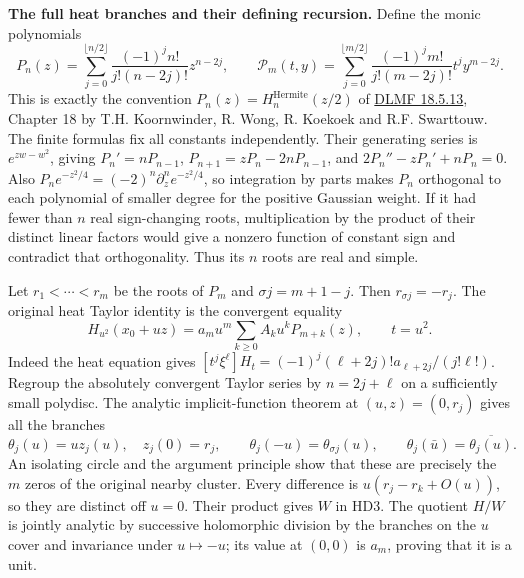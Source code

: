 \documentclass[11pt,a4paper]{article}
\theoremstyle{definition}\newtheorem{definition}[theorem]{Definition}
\begin{document}
\HD\textbf{The full heat branches and their defining recursion.}
Define the monic polynomials
\[
 P_n(z)=\sum_{j=0}^{\lfloor n/2\rfloor}
      \frac{(-1)^jn!}{j!(n-2j)!}z^{n-2j},\qquad
 \mathcal P_m(t,y)=
      \sum_{j=0}^{\lfloor m/2\rfloor}
       \frac{(-1)^jm!}{j!(m-2j)!}t^jy^{m-2j}.
 \tag{HD5}\label{hd:hermite}
\]
This is exactly the convention
$P_n(z)=H_n^{\mathrm{Hermite}}(z/2)$ of
\href{https://dlmf.nist.gov/18.5.E13}{DLMF 18.5.13},
Chapter 18 by T.H. Koornwinder, R. Wong, R. Koekoek and
R.F. Swarttouw. The finite formulas fix all constants independently.
Their generating series is $e^{zw-w^2}$, giving
$P_n'=nP_{n-1}$,
$P_{n+1}=zP_n-2nP_{n-1}$, and
$2P_n''-zP_n'+nP_n=0$.
Also $P_ne^{-z^2/4}=(-2)^n\partial_z^n e^{-z^2/4}$, so integration
by parts makes $P_n$ orthogonal to each polynomial of smaller
degree for the positive Gaussian weight. If it had fewer than
$n$ real sign-changing roots, multiplication by the product of
their distinct linear factors would give a nonzero function of
constant sign and contradict that orthogonality. Thus its $n$
roots are real and simple.

Let $r_1<\cdots<r_m$ be the roots of $P_m$ and
$\sigma j=m+1-j$. Then $r_{\sigma j}=-r_j$.
The original heat Taylor identity is the convergent equality
\[
 H_{u^2}(x_0+uz)
       =a_mu^m\sum_{k\ge0}A_k u^kP_{m+k}(z),\qquad t=u^2.
 \tag{HD6}\label{hd:fullseries}
\]
Indeed the heat equation gives
$[t^j\xi^\ell]H_t=(-1)^j(\ell+2j)!a_{\ell+2j}/(j!\ell!)$.
Regroup the absolutely convergent Taylor series by $n=2j+\ell$
on a sufficiently small polydisc.
The analytic implicit-function theorem at $(u,z)=(0,r_j)$ gives
all the branches
\[
 \theta_j(u)=u z_j(u),\quad z_j(0)=r_j,\qquad
 \theta_j(-u)=\theta_{\sigma j}(u),\qquad
 \theta_j(\bar u)=\overline{\theta_j(u)} .
 \tag{HD7}
\]
An isolating circle and the argument principle show that these
are precisely the $m$ zeros of the original nearby cluster.
Every difference is $u(r_j-r_k+O(u))$, so they are distinct off
$u=0$. Their product gives $W$ in HD3.
The quotient $H/W$ is jointly analytic by successive holomorphic
division by the branches on the $u$ cover and invariance under
$u\mapsto-u$; its value at $(0,0)$ is $a_m$, proving that it is a unit.
\end{document}
